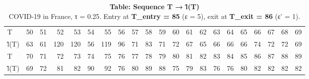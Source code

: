 \begin{table}[t]
\caption*{
{\large \textbf{Table: Sequence T → l̂(T)}} \\ 
{\small COVID-19 in France, τ = 0.25. Entry at \textbf{T\_entry = 85} (ε = 5), exit at \textbf{T\_exit = 86} (ε' = 1).}
} 
\begin{tabular*}{\linewidth}{@{\extracolsep{\fill}}lrrrrrrrrrrrrrrrrrrrr}
\toprule
 &  &  &  &  &  &  &  &  &  &  &  &  &  &  &  &  &  &  &  &  \\ 
\midrule\addlinespace[2.5pt]
T & 50 & 51 & 52 & 53 & 54 & 55 & 56 & 57 & 58 & 59 & 60 & 61 & 62 & 63 & 64 & 65 & 66 & 67 & 68 & 69 \\ 
l̂(T) & 63 & 61 & 120 & 120 & 56 & 119 & 96 & 71 & 83 & 71 & 72 & 67 & 65 & 66 & 66 & 66 & 74 & 72 & 72 & 69 \\ 
T & 70 & 71 & 72 & 73 & 74 & 75 & 76 & 77 & 78 & 79 & 80 & 81 & 82 & 83 & 84 & 85 & 86 & 87 & 88 & 89 \\ 
l̂(T) & 69 & 72 & 81 & 82 & 90 & 92 & 76 & 80 & 89 & 88 & 75 & 79 & 83 & 76 & 76 & 80 & 82 & 82 & 82 & 82 \\ 
\bottomrule
\end{tabular*}
\end{table}

